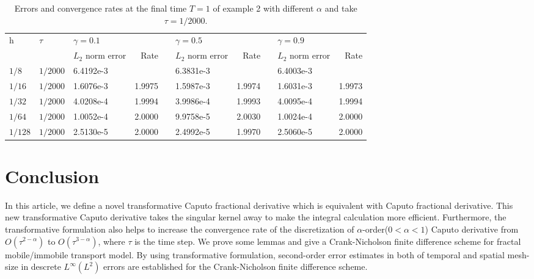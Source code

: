 \documentclass[3p,times]{elsarticle}
\begin{document}
\begin{table}[h!b!p!]
\small
\renewcommand{\arraystretch}{1.1}
\centering
\caption{\small Errors and convergence rates at the final time $T=1$ of example 2 with different $\alpha$ and take $\tau=1/2000$.}\label{tab4}
\begin{tabular}{p{0cm}p{0cm}p{1.4cm}p{1cm}p{0.5cm}p{1.4cm}p{1cm}p{0.5cm}p{1.4cm}p{1cm}}
\hline
\multicolumn{1}{l}{\multirow {2}{*}{h}}& \multicolumn{1}{l}{\multirow {2}{*}{$\tau$}}& \multicolumn{2}{l}{$\gamma=0.1$}&&\multicolumn{2}{l}{$\gamma=0.5$}&&\multicolumn{2}{l}{$\gamma=0.9$}\\
\cline{3-4}\cline{6-7} \cline{9-10}
&&\multicolumn{1}{l}{$L_2$ norm error} &\multicolumn{1}{r}{Rate} && \multicolumn{1}{l}{$L_2$ norm error} &\multicolumn{1}{r}{Rate} && \multicolumn{1}{l}{$L_2$ norm error} &\multicolumn{1}{r}{Rate} \\
\hline
\multicolumn{1}{l}{$1/8$}&\multicolumn{1}{l}{$1/2000$}&6.4192e-3&&&6.3831e-3&&&6.4003e-3\\
\multicolumn{1}{l}{$1/16$}&\multicolumn{1}{l}{$1/2000$}&1.6076e-3&\multicolumn{1}{r}{1.9975}&&1.5987e-3&\multicolumn{1}{r}{1.9974}&&1.6031e-3&\multicolumn{1}{r}{1.9973}\\
\multicolumn{1}{l}{$1/32$}&\multicolumn{1}{l}{$1/2000$}&4.0208e-4&\multicolumn{1}{r}{1.9994}&&3.9986e-4&\multicolumn{1}{r}{1.9993}&&4.0095e-4&\multicolumn{1}{r}{1.9994}\\
\multicolumn{1}{l}{$1/64$}&\multicolumn{1}{l}{$1/2000$}&1.0052e-4&\multicolumn{1}{r}{2.0000}&&9.9758e-5&\multicolumn{1}{r}{2.0030}&&1.0024e-4&\multicolumn{1}{r}{2.0000}\\
\multicolumn{1}{l}{$1/128$}&\multicolumn{1}{l}{$1/2000$}&2.5130e-5&\multicolumn{1}{r}{2.0000}&&2.4992e-5&\multicolumn{1}{r}{1.9970}&&2.5060e-5&\multicolumn{1}{r}{2.0000}\\
\hline
\end{tabular}
\end{table}


\section{Conclusion}
 In this article, we define a novel transformative Caputo fractional derivative which is equivalent with Caputo fractional derivative. This new transformative Caputo derivative takes the singular kernel away to make the integral calculation more efficient. Furthermore, the transformative formulation also helps to increase the convergence rate of the discretization of $\alpha$-order($0<\alpha<1$) Caputo derivative from $O(\tau^{2-\alpha})$ to $O(\tau^{3-\alpha})$, where $\tau$ is the time step. We prove some lemmas and give a Crank-Nicholson finite difference scheme for fractal
mobile/immobile transport model. By using transformative formulation, second-order error estimates in both of temporal and spatial mesh-size in descrete $L^\infty(L^2)$ errors are established for the Crank-Nicholson finite difference scheme.


%
\end{document}
